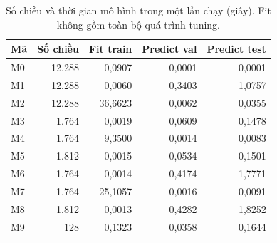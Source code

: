 \begin{table}[H]\centering\small
\caption{Số chiều và thời gian mô hình trong một lần chạy (giây). Fit không gồm toàn bộ quá trình tuning.}
\begin{tabular}{lrrrr}\toprule
Mã & Số chiều & Fit train & Predict val & Predict test\\\midrule
M0 & 12.288 & 0,0907 & 0,0001 & 0,0001\\
M1 & 12.288 & 0,0060 & 0,3403 & 1,0757\\
M2 & 12.288 & 36,6623 & 0,0062 & 0,0355\\
M3 & 1.764 & 0,0019 & 0,0609 & 0,1478\\
M4 & 1.764 & 9,3500 & 0,0014 & 0,0083\\
M5 & 1.812 & 0,0015 & 0,0534 & 0,1501\\
M6 & 1.764 & 0,0014 & 0,4174 & 1,7771\\
M7 & 1.764 & 25,1057 & 0,0016 & 0,0091\\
M8 & 1.812 & 0,0013 & 0,4282 & 1,8252\\
M9 & 128 & 0,1323 & 0,0358 & 0,1644\\
\bottomrule\end{tabular}
\end{table}
